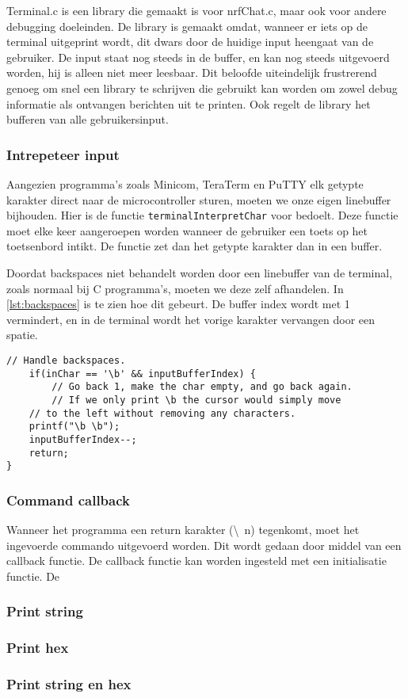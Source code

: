 
Terminal.c is een library die gemaakt is voor nrfChat.c, maar ook voor andere debugging doeleinden. De library is gemaakt omdat, wanneer er iets op de terminal uitgeprint wordt, dit dwars door de huidige input heengaat van de gebruiker. De input staat nog steeds in de buffer, en kan nog steeds uitgevoerd worden, hij is alleen niet meer leesbaar. Dit beloofde uiteindelijk frustrerend genoeg om snel een library te schrijven die gebruikt kan worden om zowel debug informatie als ontvangen berichten uit te printen. Ook regelt de library het bufferen van alle gebruikersinput.

\subsubsection{Intrepeteer input}
Aangezien programma's zoals Minicom, TeraTerm en PuTTY elk getypte karakter direct naar de microcontroller sturen, moeten we onze eigen linebuffer bijhouden. Hier is de functie \texttt{terminalInterpretChar} voor bedoelt. Deze functie moet elke keer aangeroepen worden wanneer de gebruiker een toets op het toetsenbord intikt. De functie zet dan het getypte karakter dan in een buffer. 

Doordat backspaces niet behandelt worden door een linebuffer van de terminal, zoals normaal bij C programma's, moeten we deze zelf afhandelen. In \autoref{lst:backspaces} is te zien hoe dit gebeurt. De buffer index wordt met 1 vermindert, en in de terminal wordt het vorige karakter vervangen door een spatie.



\begin{lstlisting}[caption={Backspaces afhandelen},captionpos=b,label={lst:backspaces},style=c,xleftmargin=.\textwidth,xrightmargin=.\textwidth]
    // Handle backspaces.
    if(inChar == '\b' && inputBufferIndex) {
        // Go back 1, make the char empty, and go back again.
        // If we only print \b the cursor would simply move
    // to the left without removing any characters.
    printf("\b \b");
    inputBufferIndex--;
    return;
}
\end{lstlisting}

\subsubsection{Command callback}
Wanneer het programma een return karakter (\textbackslash~n) tegenkomt, moet het ingevoerde commando uitgevoerd worden. Dit wordt gedaan door middel van een callback functie. De callback functie kan worden ingesteld met een initialisatie functie. De 

\subsubsection{Print string}
\subsubsection{Print hex}
\subsubsection{Print string en hex} \label{ch:printStrex}
